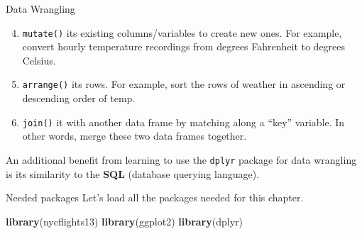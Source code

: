 \documentclass[
  ignorenonframetext,
]{beamer}
\newenvironment{Shaded}{\begin{snugshade}}{\end{snugshade}}
\newcommand{\FunctionTok}[1]{\textcolor[rgb]{0.13,0.29,0.53}{\textbf{#1}}}
\newcommand{\NormalTok}[1]{#1}
\begin{document}
\begin{frame}[fragile]{Data Wrangling}
\protect\hypertarget{data-wrangling-2}{}
\begin{enumerate}
\setcounter{enumi}{3}
\item
  \texttt{mutate()} its existing columns/variables to create new ones.
  For example, convert hourly temperature recordings from degrees
  Fahrenheit to degrees Celsius.
\item
  \texttt{arrange()} its rows. For example, sort the rows of weather in
  ascending or descending order of temp.
\item
  \texttt{join()} it with another data frame by matching along a ``key''
  variable. In other words, merge these two data frames together.
\end{enumerate}

An additional benefit from learning to use the \texttt{dplyr} package
for data wrangling is its similarity to the \textbf{SQL} (database
querying language).
\end{frame}

\begin{frame}[fragile]{Needed packages}
\protect\hypertarget{needed-packages}{}
Let's load all the packages needed for this chapter.

\normalsize

\begin{Shaded}
\begin{Highlighting}[]
\FunctionTok{library}\NormalTok{(nycflights13)}
\FunctionTok{library}\NormalTok{(ggplot2)}
\FunctionTok{library}\NormalTok{(dplyr)}
\end{Highlighting}
\end{Shaded}

\normalsize
\end{frame}
\end{document}
